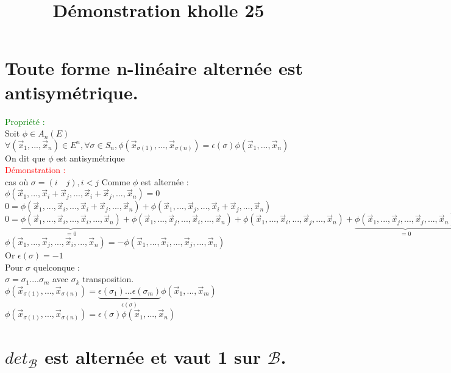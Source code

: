 \documentclass{article}
\begin{document}
\title{Démonstration kholle 25}
\date{}
\maketitle
\renewcommand{\thesection}{\Roman{section}}
	\setlength{\parindent}{1.5cm}
	\section{Toute forme n-linéaire alternée est antisymétrique.}
	\textcolor{green}{Propriété :} \\
	Soit $\phi \in A_n(E)$ \\
	$\forall (\vec x_1,...,\vec x_n) \in E^n, \forall \sigma \in S_n, \phi(\vec x_{\sigma(1)},...,\vec x_{\sigma(n)})=\epsilon(\sigma) \phi(\vec x_1,...,\vec x_n)$ \\
	On dit que $\phi$ est antisymétrique \\
	\textcolor{red}{Démonstration :} \\
	cas où $\sigma =(i \quad  j), i<j$ Comme $\phi$ est alternée : \\
	$\phi(\vec x_1,..., \vec x_i + \vec x_j,..., \vec x_i + \vec x_j,...,\vec x_n)=0$ \\
	$0=\phi(\vec x_1,..., \vec x_i,..., \vec x_i + \vec x_j,...,\vec x_n)+\phi(\vec x_1,...,  \vec x_j,..., \vec x_i + \vec x_j,...,\vec x_n) $ \\
	$0=\underbrace{\phi(\vec x_1,..., \vec x_i,..., \vec x_i ,...,\vec x_n)}_{=0}+\phi(\vec x_1,...,  \vec x_j,..., \vec x_i ,...,\vec x_n)+\phi(\vec x_1,..., \vec x_i,...,  \vec x_j,...,\vec x_n)+\underbrace{\phi(\vec x_1,...,  \vec x_j,..., \vec x_j,...,\vec x_n)}_{=0}$ \\
	$\phi(\vec x_1,..., \vec x_j,...,  \vec x_i,...,\vec x_n)=-\phi(\vec x_1,...,  \vec x_i,..., \vec x_j ,...,\vec x_n)$ \\
	Or $\epsilon(\sigma)=-1$ \\
	Pour $\sigma $ quelconque : \\
	$\sigma= \sigma_1 .... \sigma_m$ avec $\sigma_k$ transposition. \\
	$\phi(\vec x_{\sigma(1)},..., \vec x_{\sigma(n)})=\underbrace{\epsilon(\sigma_1)... \epsilon(\sigma_m)}_{\epsilon(\sigma)} \phi(\vec x_1,..., \vec x_m)$ \\
	$\phi(\vec x_{\sigma(1)},...,\vec x_{\sigma(n)})=\epsilon(\sigma) \phi(\vec x_1,...,\vec x_n)$ 
	\section{$det_{\mathcal B}$ est alternée et vaut 1 sur $\mathcal B$.}
\end{document}
